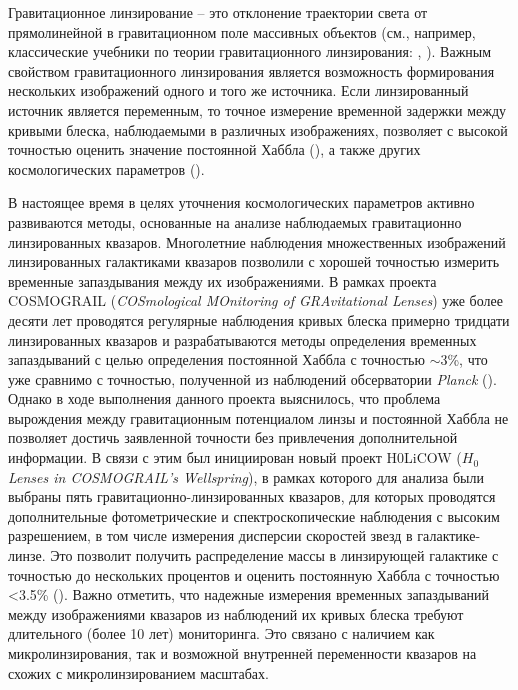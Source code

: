 Гравитационное линзирование -- это отклонение  траектории света от прямолинейной в гравитационном поле массивных объектов (см., например, классические учебники по теории гравитационного линзирования: \cite{schneider1992}, \cite{gravlensbook}). Важным свойством гравитационного линзирования является возможность формирования нескольких изображений одного и того же источника. Если линзированный источник является переменным, то точное измерение временной задержки между кривыми блеска, наблюдаемыми в различных изображениях, позволяет с высокой точностью оценить значение постоянной Хаббла (\cite{timedelaycosmography}), а также других космологических параметров (\cite{holicowXIII}).

В настоящее время в целях уточнения космологических параметров активно развиваются методы, основанные на анализе наблюдаемых гравитационно линзированных квазаров. Многолетние наблюдения множественных изображений линзированных галактиками квазаров позволили с хорошей точностью измерить временные запаздывания между их изображениями. В рамках проекта COSMOGRAIL (\textit{COSmological MOnitoring of GRAvitational Lenses}) уже более десяти лет проводятся регулярные наблюдения кривых блеска примерно тридцати линзированных квазаров и разрабатываются методы определения временных запаздываний с целью определения постоянной Хаббла с точностью $\sim$3\%, что уже сравнимо с точностью, полученной из наблюдений обсерватории \textit{Planck} (\cite{cosmograil}). Однако в ходе выполнения данного проекта выяснилось, что проблема вырождения между гравитационным потенциалом линзы и постоянной Хаббла не позволяет достичь заявленной точности без привлечения дополнительной информации. В связи с этим был инициирован новый проект H0LiCOW (\textit{$H_0$ Lenses in COSMOGRAIL's Wellspring}), в рамках которого для анализа были выбраны пять гравитационно-линзированных квазаров, для которых проводятся дополнительные фотометрические и спектроскопические наблюдения с высоким разрешением, в том числе измерения дисперсии скоростей звезд в галактике-линзе. Это позволит получить распределение массы в линзирующей галактике с точностью до нескольких процентов и оценить постоянную Хаббла с точностью <3.5\% (\cite{holicowI}). Важно отметить, что надежные измерения временных запаздываний между изображениями квазаров из наблюдений их кривых блеска требуют длительного (более 10 лет) мониторинга. Это связано с наличием как микролинзирования, так и возможной внутренней переменности квазаров на схожих с микролинзированием масштабах.

